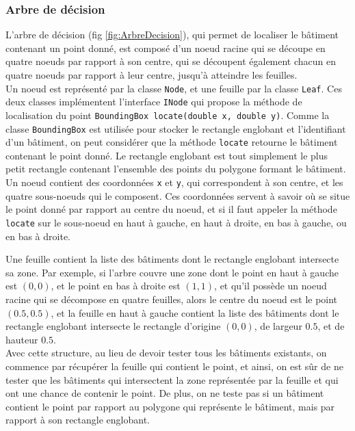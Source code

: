 \subsubsection{Arbre de décision}

L'arbre de décision (fig \ref{fig:ArbreDecision}), qui permet de localiser le bâtiment contenant un point donné, est composé d'un noeud racine qui se découpe en quatre noeuds par rapport à son centre, qui se découpent également chacun en quatre noeuds par rapport à leur centre, jusqu'à atteindre les feuilles.\\

Un noeud est représenté par la classe \texttt{Node}, et une feuille par la classe \texttt{Leaf}. Ces deux classes implémentent l'interface \texttt{INode} qui propose la méthode de localisation du point \texttt{BoundingBox locate(double x, double y)}. Comme la classe \texttt{BoundingBox} est utilisée pour stocker le rectangle englobant et l'identifiant d'un bâtiment, on peut considérer que la méthode \texttt{locate} retourne le bâtiment contenant le point donné. Le rectangle englobant est tout simplement le plus petit rectangle contenant l'ensemble des points du polygone formant le bâtiment.\\

Un noeud contient des coordonnées \texttt{x} et \texttt{y}, qui correspondent à son centre, et les quatre sous-noeuds qui le composent. Ces coordonnées servent à savoir où se situe le point donné par rapport au centre du noeud, et si il faut appeler la méthode \texttt{locate} sur le sous-noeud en haut à gauche, en haut à droite, en bas à gauche, ou en bas à droite.

Une feuille contient la liste des bâtiments dont le rectangle englobant intersecte sa zone. Par exemple, si l'arbre couvre une zone dont le point en haut à gauche est $(0, 0)$, et le point en bas à droite est $(1, 1)$, et qu'il possède un noeud racine qui se décompose en quatre feuilles, alors le centre du noeud est le point $(0.5, 0.5)$, et la feuille en haut à gauche contient la liste des bâtiments dont le rectangle englobant intersecte le rectangle d'origine $(0, 0)$, de largeur $0.5$, et de hauteur $0.5$.\\

Avec cette structure, au lieu de devoir tester tous les bâtiments existants, on commence par récupérer la feuille qui contient le point, et ainsi, on est sûr de ne tester que les bâtiments qui intersectent la zone représentée par la feuille et qui ont une chance de contenir le point. De plus, on ne teste pas si un bâtiment contient le point par rapport au polygone qui représente le bâtiment, mais par rapport à son rectangle englobant.

